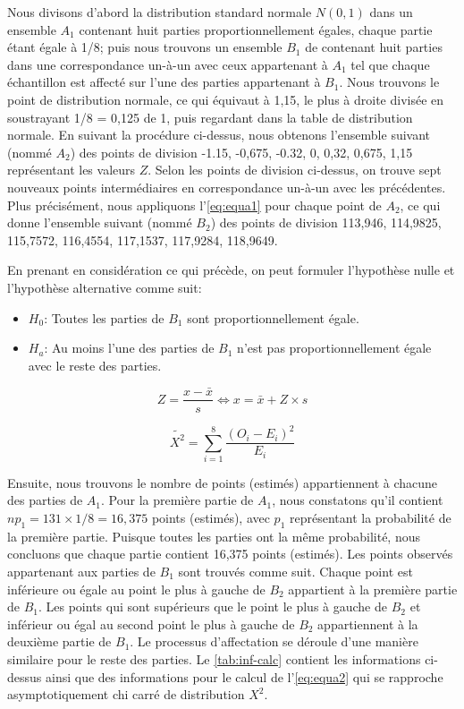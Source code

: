Nous divisons d'abord la distribution standard normale $N(0,1)$ dans un ensemble $A_1$ contenant huit parties proportionnellement égales, chaque partie étant égale à 1/8; puis nous trouvons un ensemble $B_1$ de contenant huit parties dans une correspondance un-à-un avec ceux appartenant à $A_1$ tel que chaque échantillon est affecté sur l'une des parties appartenant à $ B_1 $. Nous trouvons le point de distribution normale, ce qui équivaut à 1,15, le plus à droite divisée en soustrayant 1/8 = 0,125 de 1, puis regardant dans la table de distribution normale. En suivant la procédure ci-dessus, nous obtenons l'ensemble suivant (nommé $A_2$) des points de division {-1.15, -0,675, -0.32, 0, 0,32, 0,675, 1,15} représentant les valeurs $Z$. Selon les points de division ci-dessus, on trouve sept nouveaux points intermédiaires en correspondance un-à-un avec les précédentes. Plus précisément, nous appliquons l'\ref{eq:equa1} pour chaque point de $A_2$, ce qui donne l'ensemble suivant (nommé $B_2$) des points de division {113,946, 114,9825, 115,7572, 116,4554, 117,1537, 117,9284, 118,9649}.

En prenant en considération ce qui précède, on peut formuler l'hypothèse nulle et l'hypothèse alternative comme suit:
\begin{itemize}
 \item $H_0$: Toutes les parties de $B_1$ sont proportionnellement égale.
 \item $H_a$: Au moins l'une des parties de $B_1$ n'est pas proportionnellement égale avec le reste des parties.
\end{itemize}

\begin{equation}\label{eq:equa1}
 Z = \frac{x-\bar{x}}{s} \Leftrightarrow x = \bar{x} + Z \times s
\end{equation} 

\begin{equation}\label{eq:equa2}
 \tilde{X^2} = \sum_{i=1}^{8} \frac{(O_i-E_i)^2}{E_i}
\end{equation}

Ensuite, nous trouvons le nombre de points (estimés) appartiennent à chacune des parties de $A_1$. Pour la première partie de $A_1$, nous constatons qu'il contient $np_1 = 131 \times 1/8 = 16,375$ points (estimés), avec $p_1$ représentant la probabilité de la première partie. Puisque toutes les parties ont la même probabilité, nous concluons que chaque partie contient 16,375 points (estimés). Les points observés appartenant aux parties de $B_1$ sont trouvés comme suit. Chaque point est inférieure ou égale au point le plus à gauche de $B_2$ appartient à la première partie de $B_1$. Les points qui sont supérieurs que le point le plus à gauche de $B_2$ et inférieur ou égal au second point le plus à gauche de $B_2$ appartiennent à la deuxième partie de $B_1$. Le processus d'affectation se déroule d'une manière similaire pour le reste des parties. Le \ref{tab:inf-calc} contient les informations ci-dessus ainsi que des informations pour le calcul de l'\ref{eq:equa2} qui se rapproche asymptotiquement chi carré de distribution $X^2$.

